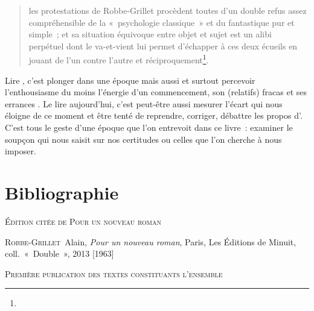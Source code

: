 \documentclass[12pt, a4paper]{article}
\begin{document}
\begin{quote}
    les protestations de Robbe-Grillet procèdent toutes d'un double refus assez compréhensible de la «~psychologie classique~» et du fantastique pur et simple~; et sa situation équivoque entre objet et sujet est un alibi perpétuel dont le va-et-vient lui permet d'échapper à ces deux écueils en jouant de l'un contre l'autre et réciproquement\footnote{}.
\end{quote}

\newpage

\vspace*{4cm}


Lire \punr, c'est plonger dans une époque mais aussi et surtout percevoir l'enthousiasme du moins l'énergie d'un commencement, son (relatifs) fracas et ses errances %
. Le lire aujourd'hui, c'est peut-être aussi mesurer l'écart qui nous éloigne de ce moment et être tenté de reprendre, corriger, débattre les propos d'\robbe. C'est tous le geste d'une époque que l'on entrevoit dans ce livre~: examiner le soupçon qui nous saisit sur nos certitudes ou celles que l'on cherche à nous imposer.




\newpage
\section{Bibliographie}
    
        
        \vspace*{2cm}
        \setlength{\parindent}{0cm}
{\large\textsc{Édition citée de Pour un nouveau roman}}
        \vspace*{1cm}
        \setlength{\parindent}{25pt}
        
        
        

        
        \textsc{Robbe-Grillet}~Alain, \textit{Pour un nouveau roman}, Paris, Les Éditions de Minuit, coll.~«~Double~», 2013 [1963]\par 
    
        \vspace*{2cm}
        \setlength{\parindent}{0cm}
{\large\textsc{Première publication des textes constituants l'ensemble}}
        \vspace*{1cm}
        \setlength{\parindent}{25pt}
        
\end{document}
